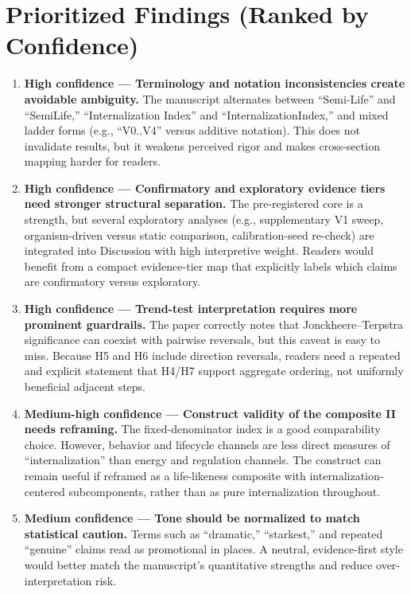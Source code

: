 \documentclass[11pt]{article}
\begin{document}
\section*{Prioritized Findings (Ranked by Confidence)}
\begin{enumerate}[leftmargin=1.5em]
  \item \textbf{High confidence --- Terminology and notation inconsistencies create avoidable ambiguity.}
  The manuscript alternates between ``Semi-Life'' and ``SemiLife,'' ``Internalization Index'' and ``InternalizationIndex,'' and mixed ladder forms (e.g., ``V0..V4'' versus additive notation). This does not invalidate results, but it weakens perceived rigor and makes cross-section mapping harder for readers.

  \item \textbf{High confidence --- Confirmatory and exploratory evidence tiers need stronger structural separation.}
  The pre-registered core is a strength, but several exploratory analyses (e.g., supplementary V1 sweep, organism-driven versus static comparison, calibration-seed re-check) are integrated into Discussion with high interpretive weight. Readers would benefit from a compact evidence-tier map that explicitly labels which claims are confirmatory versus exploratory.

  \item \textbf{High confidence --- Trend-test interpretation requires more prominent guardrails.}
  The paper correctly notes that Jonckheere--Terpstra significance can coexist with pairwise reversals, but this caveat is easy to miss. Because H5 and H6 include direction reversals, readers need a repeated and explicit statement that H4/H7 support aggregate ordering, not uniformly beneficial adjacent steps.

  \item \textbf{Medium-high confidence --- Construct validity of the composite II needs reframing.}
  The fixed-denominator index is a good comparability choice. However, behavior and lifecycle channels are less direct measures of ``internalization'' than energy and regulation channels. The construct can remain useful if reframed as a life-likeness composite with internalization-centered subcomponents, rather than as pure internalization throughout.

  \item \textbf{Medium confidence --- Tone should be normalized to match statistical caution.}
  Terms such as ``dramatic,'' ``starkest,'' and repeated ``genuine'' claims read as promotional in places. A neutral, evidence-first style would better match the manuscript's quantitative strengths and reduce over-interpretation risk.


\end{enumerate}
\end{document}
